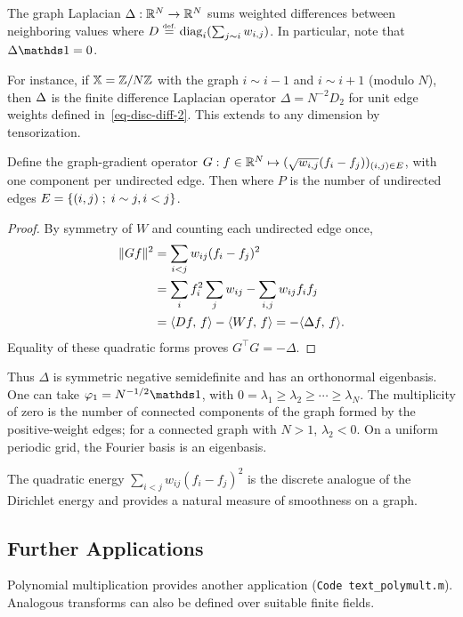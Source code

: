 The graph Laplacian $\Delta:\mathbb{R}^N\to\mathbb{R}^N$ sums weighted differences between neighboring values
where $D \stackrel{\mbox{\upshape\tiny def.}}{=} \operatorname{diag}_i(\sum_{j \sim i} w_{i,j})$. In particular, note that $\Delta\ones=0$.

For instance, if $\mathbb{X} = \mathbb{Z}/N\mathbb{Z}$ with the graph $i \sim i-1$ and $i \sim i+1$ (modulo $N$), then $\Delta$ is the finite difference Laplacian operator $\Delta=N^{-2}D_2$ for unit edge weights defined in~\eqref{eq-disc-diff-2}. This extends to any dimension by tensorization.

\begin{prop}
Define the graph-gradient operator $G : f \in \mathbb{R}^N \mapsto ( \sqrt{w_{i,j}} (f_i-f_j) )_{(i,j)\in E}$, with one component per undirected edge. Then
where $P$ is the number of undirected edges $E=\left\{ (i,j) \;;\; i \sim j, i<j \right\}$.
\end{prop}
\begin{proof}
By symmetry of $W$ and counting each undirected edge once,
\begin{align*}
 \lVert Gf\rVert^2
 &=\sum_{i<j}w_{ij}(f_i-f_j)^2\\
 &=\sum_i f_i^2\sum_jw_{ij}-\sum_{i,j}w_{ij}f_if_j\\
 &=\langle Df,\,f\rangle-\langle Wf,\,f\rangle=-\langle \Delta f,\,f\rangle.
\end{align*}
Equality of these quadratic forms proves $G^\top G=-\Delta$.
\end{proof}

Thus $\Delta$ is symmetric negative semidefinite and has an orthonormal eigenbasis. One can take $\phi_1=N^{-1/2}\ones$, with $0=\lambda_1\geq\lambda_2\geq\cdots\geq\lambda_N$. The multiplicity of zero is the number of connected components of the graph formed by the positive-weight edges; for a connected graph with $N>1$, $\lambda_2<0$. On a uniform periodic grid, the Fourier basis is an eigenbasis.

The quadratic energy $\sum_{i<j}w_{ij}(f_i-f_j)^2$ is the discrete analogue of the Dirichlet energy and provides a natural measure of smoothness on a graph.



\subsection{Further Applications}

Polynomial multiplication provides another application (\texttt{Code text\_polymult.m}).
%
Analogous transforms can also be defined over suitable finite fields.
